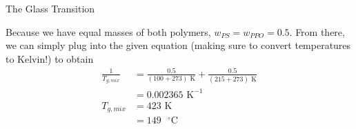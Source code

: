 \begin{activity}{The Glass Transition}
\begin{exercises}
		\begin{solution}{}
			Because we have equal masses of both polymers, $w_{PS} = w_{PPO} = 0.5$.  From there, we can simply plug into the given equation (making sure to convert temperatures to Kelvin!) to obtain
			\begin{align*}
				\frac{1}{T_{g,mix}} &= \frac{0.5}{(100+273)\text{ K}} + \frac{0.5}{(215+273)\text{ K}}\\
					\, &= 0.002365\text{ K}^{-1}\\
				T_{g,mix} &= 423\text{ K}\\
				&= 149\text{ }^\circ\text{C}
			\end{align*}
		\end{solution}
	
\end{exercises}


%
%	


	
\end{activity}